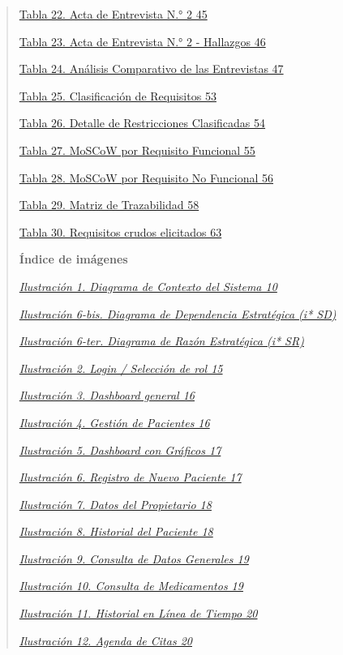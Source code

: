 \documentclass[
]{article}
\begin{document}
\begin{quote}
\hyperref[_bookmark81]{Tabla 22. Acta de Entrevista N.° 2 45}

\hyperref[_bookmark82]{Tabla 23. Acta de Entrevista N.° 2 - Hallazgos 46}

\hyperref[_bookmark84]{Tabla 24. Análisis Comparativo de las Entrevistas 47}

\hyperref[_bookmark102]{Tabla 25. Clasificación de Requisitos 53}

\hyperref[_bookmark103]{Tabla 26. Detalle de Restricciones Clasificadas 54}

\hyperref[_bookmark104]{Tabla 27. MoSCoW por Requisito Funcional 55}

\hyperref[_bookmark106]{Tabla 28. MoSCoW por Requisito No Funcional 56}

\hyperref[_bookmark113]{Tabla 29. Matriz de Trazabilidad 58}

\hyperref[_bookmark117]{Tabla 30. Requisitos crudos elicitados 63}

\textbf{Índice de imágenes}

\hyperref[_bookmark13]{\emph{Ilustración 1. Diagrama de Contexto del Sistema 10}}

\hyperref[_bookmark19b]{\emph{Ilustración 6-bis. Diagrama de Dependencia Estratégica (i* SD)}}

\hyperref[_bookmark19c]{\emph{Ilustración 6-ter. Diagrama de Razón Estratégica (i* SR)}}

\hyperref[_bookmark25]{\emph{Ilustración 2. Login / Selección de rol 15}}

\hyperref[_bookmark26]{\emph{Ilustración 3. Dashboard general 16}}

\hyperref[_bookmark27]{\emph{Ilustración 4. Gestión de Pacientes 16}}

\hyperref[_bookmark28]{\emph{Ilustración 5. Dashboard con Gráficos 17}}

\hyperref[_bookmark29]{\emph{Ilustración 6. Registro de Nuevo Paciente 17}}

\hyperref[_bookmark30]{\emph{Ilustración 7. Datos del Propietario 18}}

\hyperref[_bookmark31]{\emph{Ilustración 8. Historial del Paciente 18}}

\hyperref[_bookmark32]{\emph{Ilustración 9. Consulta de Datos Generales 19}}

\hyperref[_bookmark33]{\emph{Ilustración 10. Consulta de Medicamentos 19}}

\hyperref[_bookmark34]{\emph{Ilustración 11. Historial en Línea de Tiempo 20}}

\hyperref[_bookmark35]{\emph{Ilustración 12. Agenda de Citas 20}}


\end{quote}
\end{document}
